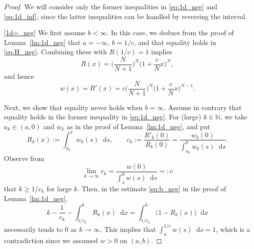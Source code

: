 \documentclass[10pt,a4paper]{amsart}
\newcommand{\N}{\mathbb{N}}
\newcommand*\diff{\mathop{}\!\mathrm{d}}
\begin{document}
\begin{proof}
We will consider only the former inequalities in \eqref{eq:1d_neg} and \eqref{eq:1d_inf},
since the latter inequalities can be handled by reversing the interval.

\eqref{1d=_neg}
We first assume $b<\infty$.
In this case, we deduce from the proof of Lemma~\ref{lm:1d_neg} that $a=-\infty$, $b=1/c$, and that equality holds in \eqref{eq:H_neg}.
Combining these with $R(1/c)=1$ implies
\[ R(x) =\biggl( \frac{N}{N+1} \biggr)^N \biggl( 1+\frac{c}{N}x \biggr)^N, \]
and hence
\[ w(x) =R'(x) =c \biggl( \frac{N}{N+1} \biggr)^N \biggl( 1+\frac{c}{N}x \biggr)^{N-1}. \]

Next, we show that equality never holds when $b=\infty$.
Assume in contrary that equality holds in the former inequality in \eqref{eq:1d_neg}.
For (large) $k \in \N$, we take $a_k \in (a,0)$ and $w_k$ as in the proof of Lemma~\ref{lm:1d_neg}, and put
\[ R_k(x) :=\int_{a_k}^x w_k(s) \diff s, \qquad
 c_k:=\frac{R'_k(0)}{R_k(0)} =\frac{w_k(0)}{\int_{a_k}^0 w_k(s) \diff s}. \]
Observe from
\[ \lim_{k \to \infty} c_k = \frac{w(0)}{\int_a^0 w(s) \diff s} =:c \]
that $k \ge 1/c_k$ for large $k$.
Then, in the estimate \eqref{eq:b_neg} in the proof of Lemma~\ref{lm:1d_neg},
\[ k-\frac{1}{c_k} -\int_{1/c_k}^k R_k(x) \diff x =\int_{1/c_k}^k \bigl( 1-R_k(x) \bigr) \diff x \]
necessarily tends to $0$ as $k \to \infty$.
This implies that $\int_a^{1/c} w(s) \diff s =1$,
which is a contradiction since we assumed $w>0$ on $(a,b)$.


\end{proof}
\end{document}
